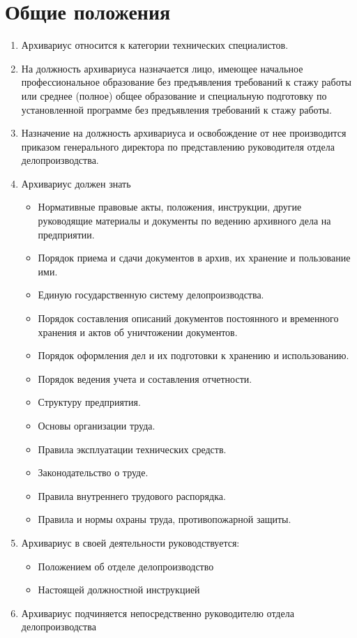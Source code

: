 \documentclass[a4paper,12pt]{article}
\begin{document}
\section{Общие положения}
\begin{enumerate}
	\item Архивариус относится к категории технических специалистов.
	\item На должность архивариуса назначается лицо, имеющее начальное профессиональное образование без предъявления требований к стажу работы или среднее (полное) общее образование и специальную подготовку по установленной программе без предъявления требований к стажу работы.
	\item Назначение на должность архивариуса и освобождение от нее производится приказом генерального директора по представлению руководителя отдела делопроизводства.
	\item Архивариус должен знать
	\begin{itemize}
		\item Нормативные правовые акты, положения, инструкции, другие руководящие материалы и документы по ведению архивного дела на предприятии.
		\item Порядок приема и сдачи документов в архив, их хранение и пользование ими.
		\item Единую государственную систему делопроизводства.
		\item Порядок составления описаний документов постоянного и временного хранения и актов об уничтожении документов.
		\item Порядок оформления дел и их подготовки к хранению и использованию.
		\item Порядок ведения учета и составления отчетности.
		\item Структуру предприятия.
		\item Основы организации труда.
		\item Правила эксплуатации технических средств.
		\item Законодательство о труде.
		\item Правила внутреннего трудового распорядка.
		\item Правила и нормы охраны труда, противопожарной защиты.
	\end{itemize}

\newpage
\item Архивариус в своей деятельности руководствуется:
\begin{itemize}
	\item Положением об отделе делопроизводство
	\item Настоящей должностной инструкцией
\end{itemize}

\item Архивариус подчиняется непосредственно руководителю отдела делопроизводства
\end{enumerate}
\end{document}
